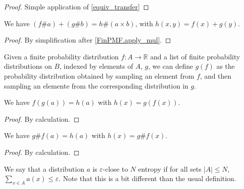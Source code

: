 \begin{proof}
    \leanok
    Simple application of \ref{equiv_transfer}
\end{proof}

\begin{lemma}
    \label{FinPMF.apply_add}
    \leanok
    We have $(f \# a) + (g \# b) = h \# (a \times b)$, with $h(x, y) = f(x) + g(y)$.
\end{lemma}

\begin{proof}
    \leanok
    By simplification after \ref{FinPMF.apply_mul}.
\end{proof}

\begin{definition}
    \label{FinPMF.linear_combination}
    \leanok
    Given a finite probability distribution $f: A \to \mathbb{R}$ and a list of finite probability distributions on $B$, indexed by
    elements of $A$, $g$, we can define $g(f)$ as the probability distribution obtained by sampling an element from $f$, and then
    sampling an elemente from the corresponding distribution in $g$.
\end{definition}


\begin{lemma}
    \label{linear_combination_linear_combination}
    \leanok
    We have $f(g(a)) = h(a)$ with $h(x) = g(f(x))$.
\end{lemma}

\begin{proof}
    \leanok
    By calculation.
\end{proof}

\begin{lemma}
    \label{linear_combination_apply}
    \leanok
    We have $g \# f(a) = h(a)$ with $h(x) = g\# f(x)$.
\end{lemma}

\begin{proof}
    \leanok
    By calculation.
\end{proof}

\begin{definition}
    \label{close_high_entropy}
    \leanok
    We say that a distribution $a$ is $\varepsilon$-close to $N$ entropy if for all sets $|A| \leq N$,
    $\sum_{x \in A} a(x) \leq \varepsilon$. Note that this is a bit different than the usual definition.
\end{definition}

